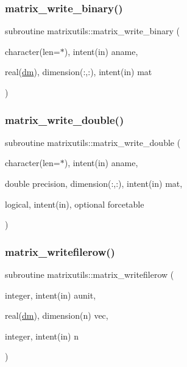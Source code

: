 \subsubsection{\texorpdfstring{matrix\+\_\+write\+\_\+binary()}{matrix\_write\_binary()}}
{\footnotesize\ttfamily subroutine matrixutils\+::matrix\+\_\+write\+\_\+binary (\begin{DoxyParamCaption}\item[{character(len=$\ast$), intent(in)}]{aname,  }\item[{real(\mbox{\hyperlink{namespacematrixutils_a7bdc564986ea4d90f51201c75606ef3d}{dm}}), dimension(\+:,\+:), intent(in)}]{mat }\end{DoxyParamCaption})}

\mbox{\label{namespacematrixutils_aa5eb3cbf41718ad7ccb335e642a29174}} 
\subsubsection{\texorpdfstring{matrix\+\_\+write\+\_\+double()}{matrix\_write\_double()}}
{\footnotesize\ttfamily subroutine matrixutils\+::matrix\+\_\+write\+\_\+double (\begin{DoxyParamCaption}\item[{character(len=$\ast$), intent(in)}]{aname,  }\item[{double precision, dimension(\+:,\+:), intent(in)}]{mat,  }\item[{logical, intent(in), optional}]{forcetable }\end{DoxyParamCaption})}

\mbox{\label{namespacematrixutils_a88175f31021d0939c32287595d3f5630}} 
\subsubsection{\texorpdfstring{matrix\+\_\+writefilerow()}{matrix\_writefilerow()}}
{\footnotesize\ttfamily subroutine matrixutils\+::matrix\+\_\+writefilerow (\begin{DoxyParamCaption}\item[{integer, intent(in)}]{aunit,  }\item[{real(\mbox{\hyperlink{namespacematrixutils_a7bdc564986ea4d90f51201c75606ef3d}{dm}}), dimension(n)}]{vec,  }\item[{integer, intent(in)}]{n }\end{DoxyParamCaption})}



